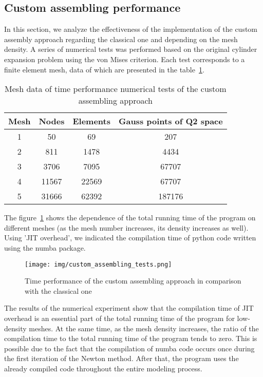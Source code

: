 \documentclass[12pt]{article}
\begin{document}
\subsection{Custom assembling performance}

In this section, we analyze the effectiveness of the implementation of the custom assembly approach regarding the classical one and depending on the mesh density. A series of numerical tests was performed based on the original cylinder expansion problem using the von Mises criterion. Each test corresponds to a finite element mesh, data of which are presented in the table~\ref{tab:custom_assembling_tests}. 

\begin{table}[H]
	\centering
	\begin{tabular}{|cccc|}
		\hline
		Mesh & Nodes & Elements & Gauss points of Q2 space \\
		\hline
		1 & 50	& 69 & 207 \\
		2 & 811 & 1478 & 4434 \\
		3 & 3706 & 7095 & 67707 \\
		4 & 11567 & 22569 & 67707 \\
		5 & 31666 & 62392 & 187176 \\
		\hline
	\end{tabular}
	\caption{Mesh data of time performance numerical tests of the custom assembling approach}
    \label{tab:custom_assembling_tests}
\end{table}

The figure~\ref{fig:custom_assembling_analysis} shows the dependence of the total running time of the program on different meshes (as the mesh number increases, its density increases as well). Using 'JIT overhead', we indicated the compilation time of python code written using the numba package.

\begin{figure}[H]
    \center
    \texttt{[image: img/custom\_assembling\_tests.png]}
    \caption{Time performance of the custom assembling approach in comparison with the classical one}
    \label{fig:custom_assembling_analysis}
\end{figure}

The results of the numerical experiment show that the compilation time of JIT overhead is an essential part of the total running time of the program for low-density meshes. At the same time, as the mesh density increases, the ratio of the compilation time to the total running time of the program tends to zero. This is possible due to the fact that the compilation of numba code occurs once during the first iteration of the Newton method. After that, the program uses the already compiled code throughout the entire modeling process.
\end{document}
